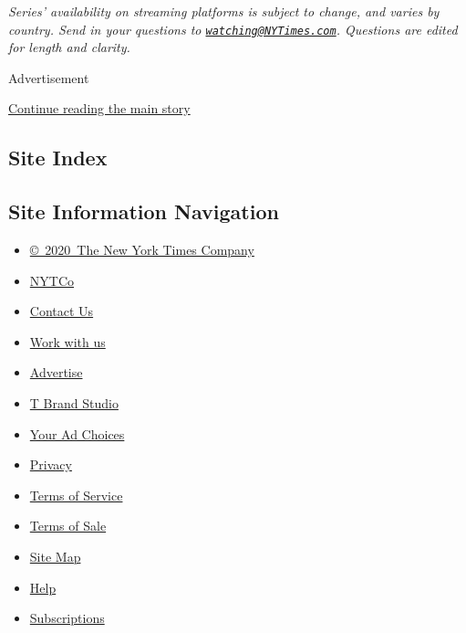 \emph{Series' availability on streaming platforms is subject to change,
and varies by country. Send in your questions to
\href{mailto:watching@NYTimes.com}{\nolinkurl{watching@NYTimes.com}}.
Questions are edited for length and clarity.}

Advertisement

\protect\hyperlink{after-bottom}{Continue reading the main story}

\hypertarget{site-index}{%
\subsection{Site Index}\label{site-index}}

\hypertarget{site-information-navigation}{%
\subsection{Site Information
Navigation}\label{site-information-navigation}}

\begin{itemize}
\tightlist
\item
  \href{https://help.nytimes3xbfgragh.onion/hc/en-us/articles/115014792127-Copyright-notice}{©~2020~The
  New York Times Company}
\end{itemize}

\begin{itemize}
\tightlist
\item
  \href{https://www.nytco.com/}{NYTCo}
\item
  \href{https://help.nytimes3xbfgragh.onion/hc/en-us/articles/115015385887-Contact-Us}{Contact
  Us}
\item
  \href{https://www.nytco.com/careers/}{Work with us}
\item
  \href{https://nytmediakit.com/}{Advertise}
\item
  \href{http://www.tbrandstudio.com/}{T Brand Studio}
\item
  \href{https://www.nytimes3xbfgragh.onion/privacy/cookie-policy\#how-do-i-manage-trackers}{Your
  Ad Choices}
\item
  \href{https://www.nytimes3xbfgragh.onion/privacy}{Privacy}
\item
  \href{https://help.nytimes3xbfgragh.onion/hc/en-us/articles/115014893428-Terms-of-service}{Terms
  of Service}
\item
  \href{https://help.nytimes3xbfgragh.onion/hc/en-us/articles/115014893968-Terms-of-sale}{Terms
  of Sale}
\item
  \href{https://spiderbites.nytimes3xbfgragh.onion}{Site Map}
\item
  \href{https://help.nytimes3xbfgragh.onion/hc/en-us}{Help}
\item
  \href{https://www.nytimes3xbfgragh.onion/subscription?campaignId=37WXW}{Subscriptions}
\end{itemize}
